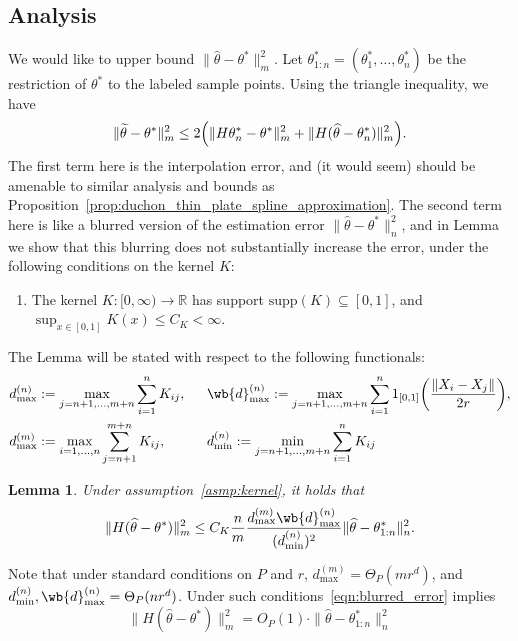 \documentclass{article}
\newcommand{\Reals}{\mathbb{R}}
\newcommand{\1}{\mathbf{1}}
\newcommand{\wt}[1]{\widetilde{#1}}
\newcommand{\wh}[1]{\widehat{#1}}
\newtheorem{lemma}{Lemma}
\theoremstyle{definition}
\theoremstyle{remark}
\begin{document}
\subsection{Analysis}
We would like to upper bound $\|\wh{\theta} - \theta^{\ast}\|_{m}^2$. Let $\theta_{1:n}^{\ast} = (\theta_1^{\ast},\ldots,\theta_n^{\ast})$ be the restriction of $\theta^{\ast}$ to the labeled sample points. Using the triangle inequality, we have
\begin{equation}
\|\wt{\theta} - \theta^{\ast}\|_{m}^2 \leq 2\Bigl(\|H\theta_n^{\ast} - \theta^{\ast}\|_m^2 + \|H(\wh{\theta} - \theta_n^{\ast})\|_{m}^2\Bigr).
\end{equation}
The first term here is the interpolation error, and (it would seem) should be amenable to similar analysis and bounds as Proposition~\ref{prop:duchon_thin_plate_spline_approximation}. The second term here is like a blurred version of the estimation error $\|\wh{\theta} - \theta^{\ast}\|_n^2$, and in Lemma~ we show that this blurring does not substantially increase the error, under the following conditions on the kernel $K$:
\begin{enumerate}[label=(A\arabic*)]
	\item 
	\label{asmp:kernel} The kernel $K: [0,\infty) \to \Reals$ has support $\mathrm{supp}(K) \subseteq [0,1]$, and $\sup_{x \in [0,1]} K(x) \leq C_K < \infty$.
\end{enumerate}
The Lemma will be stated with respect to the following functionals:
\begin{align*}
d_{\max}^{(n)} & := \max_{j = n + 1,\ldots,m + n} \sum_{i = 1}^{n} K_{ij},~~ && \wb{d}_{\max}^{(n)} := \max_{j = n + 1,\ldots,m + n} \sum_{i = 1}^{n} 1_{[0,1]}\biggl(\frac{\|X_i - X_j\|}{2r}\biggr), \\
d_{\max}^{(m)} & := \max_{i = 1,\ldots,n} \sum_{j = n + 1}^{m + n} K_{ij},~~ && d_{\min}^{(n)} := \min_{j = n + 1,\ldots,m + n} \sum_{i = 1}^{n} K_{ij}
\end{align*}
\begin{lemma}
	\label{lem:blurred_error}
	Under assumption~\ref{asmp:kernel}, it holds that
	\begin{equation}
	\label{eqn:blurred_error}
	\|H(\wh{\theta} - \theta^{\ast})\|_m^2 \leq C_K \frac{n}{m}\frac{d_{\max}^{(m)} \wb{d}_{\max}^{(n)}}{(d_{\min}^{(n)})^2}\|\wh{\theta} - \theta_{1:n}^{\ast}\|_n^2.
	\end{equation}
\end{lemma}

Note that under standard conditions on $P$ and $r$, $d_{\max}^{(m)} = \Theta_P(mr^d)$, and $d_{\min}^{(n)}, \wb{d}_{\max}^{(n)} = \Theta_P(nr^d)$. Under such conditions~\eqref{eqn:blurred_error} implies
\begin{equation*}
\|H(\wh{\theta} - \theta^{\ast})\|_m^2 = O_P(1) \cdot \|\wh{\theta} - \theta_{1:n}^{\ast}\|_n^2
\end{equation*}
\end{document}
